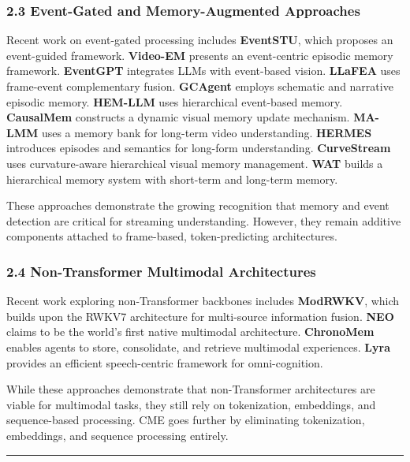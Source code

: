 \documentclass[
  11pt,
  a4paper,
]{article}
\begin{document}
\subsubsection{2.3 Event-Gated and Memory-Augmented
Approaches}\label{event-gated-and-memory-augmented-approaches}

Recent work on event-gated processing includes \textbf{EventSTU}, which
proposes an event-guided framework. \textbf{Video-EM} presents an
event-centric episodic memory framework. \textbf{EventGPT} integrates
LLMs with event-based vision. \textbf{LLaFEA} uses frame-event
complementary fusion. \textbf{GCAgent} employs schematic and narrative
episodic memory. \textbf{HEM-LLM} uses hierarchical event-based memory.
\textbf{CausalMem} constructs a dynamic visual memory update mechanism.
\textbf{MA-LMM} uses a memory bank for long-term video understanding.
\textbf{HERMES} introduces episodes and semantics for long-form
understanding. \textbf{CurveStream} uses curvature-aware hierarchical
visual memory management. \textbf{WAT} builds a hierarchical memory
system with short-term and long-term memory.

These approaches demonstrate the growing recognition that memory and
event detection are critical for streaming understanding. However, they
remain additive components attached to frame-based, token-predicting
architectures.

\subsubsection{2.4 Non-Transformer Multimodal
Architectures}\label{non-transformer-multimodal-architectures}

Recent work exploring non-Transformer backbones includes
\textbf{ModRWKV}, which builds upon the RWKV7 architecture for
multi-source information fusion. \textbf{NEO} claims to be the world's
first native multimodal architecture. \textbf{ChronoMem} enables agents
to store, consolidate, and retrieve multimodal experiences.
\textbf{Lyra} provides an efficient speech-centric framework for
omni-cognition.

While these approaches demonstrate that non-Transformer architectures
are viable for multimodal tasks, they still rely on tokenization,
embeddings, and sequence-based processing. CME goes further by
eliminating tokenization, embeddings, and sequence processing entirely.

\begin{center}\rule{0.5\linewidth}{0.5pt}\end{center}
\end{document}
